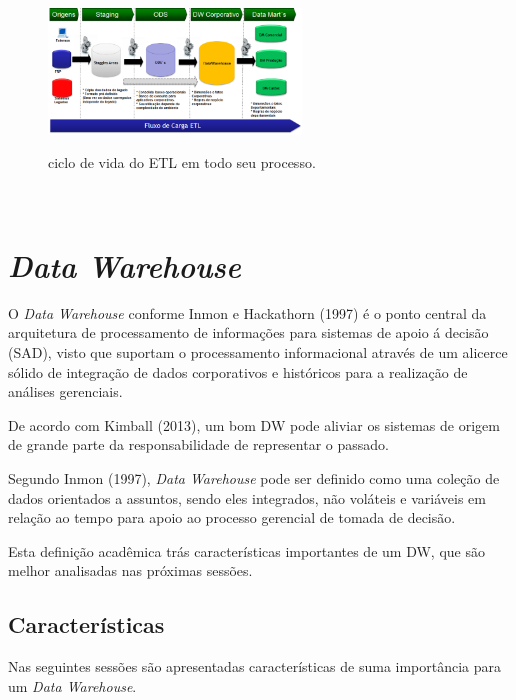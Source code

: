 \begin{figure}[H]
	\vspace*{0,2cm}
    \centering
    \caption{ciclo de vida do ETL em todo seu processo.}
    \includegraphics[width=0.6\textwidth]{./04-figuras/figura-05}
    \label{fig:ilustfig05}
\end{figure}
\vspace*{-0,9cm}
{\raggedright {}}\\

\section{\textit{Data Warehouse}}

O \textit{Data Warehouse} conforme Inmon e Hackathorn (1997) é o ponto central da arquitetura de processamento de informações para sistemas de apoio á decisão (SAD), visto que suportam o processamento informacional através de um alicerce sólido de integração de dados corporativos e históricos para a realização de análises gerenciais.

De acordo com Kimball (2013), um bom DW pode aliviar os sistemas de origem de grande parte da responsabilidade de representar o passado.

Segundo Inmon (1997), \textit{Data Warehouse} pode ser definido como uma coleção de dados orientados a assuntos, sendo eles integrados, não voláteis e variáveis em relação ao tempo para apoio ao processo gerencial de tomada de decisão.

Esta definição acadêmica trás características importantes de um DW, que são melhor analisadas nas próximas sessões.

\subsection{Características}

Nas seguintes sessões são apresentadas características de suma importância para um \textit{Data Warehouse}.

